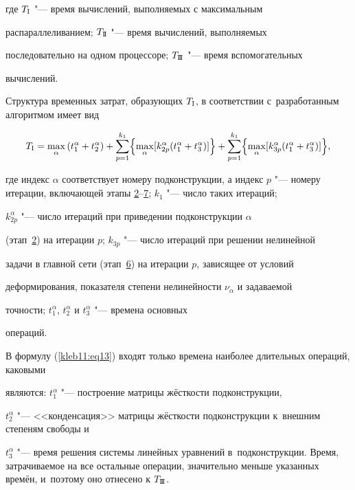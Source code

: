 где $T_\text{\sc I}$ "--- время вычислений, выполняемых с максимальным

распараллеливанием; $T_\text{\sc I\!I}$ "--- время вычислений, выполняемых

последовательно на одном процессоре; $T_\text{\sc I\!I\!I}$ "--- время вспомогательных

вычислений.



Структура временных затрат, образующих $T_\text{\sc I}$, в соответствии с~разработанным алгоритмом имеет вид

\begin{equation}

\label{kleb11:eq16} T_\text{\sc I}=\max _\alpha \left( t_1^\alpha + t_2^\alpha \right) + \sum \limits_{p=1}^{k_1}

\Bigl\{ \max_\alpha [k_{2p}^\alpha ( t_1^\alpha + t_3^\alpha ) ] \Bigr\} +

\sum\limits_{p=1}^{k_1} \Bigl\{ \max_\alpha [ k_{3p}^\alpha ( t_1^\alpha + t_3^\alpha  ) ] \Bigr\},

\end{equation}

где индекс $\alpha $ соответствует номеру подконструкции, а индекс $p$ "--- номеру итерации, включающей этапы \hyperlink{et:2}{2}--\hyperlink{et:7}{7}; $k_1$ "--- число таких итераций;

$k_{2p}^\alpha $ "--- число итераций при приведении подконструкции $\alpha $

(этап~\hyperlink{et:2}{2}) на итерации $p$; $k_{3p} $ "--- число итераций при решении нелинейной

задачи в главной сети (этап~\hyperlink{et:6}{6}) на итерации $p$, зависящее от условий

деформирования, показателя степени нелинейности $\nu_\alpha$ и задаваемой

точности; $t_1^\alpha $, $t_2^\alpha $ и $t_3^\alpha $ "--- времена основных

операций.



В формулу (\ref{kleb11:eq13}) входят только времена наиболее длительных операций, каковыми

являются: $t_1^\alpha $ "--- построение матрицы жёсткости подконструкции,

$t_2^\alpha$ "--- <<конденсация>> матрицы жёсткости подконструкции к~внешним степеням свободы  и 

$t_3^\alpha$ "--- время решения системы линейных уравнений в~подконструкции. Время, затрачиваемое на все остальные операции, значительно меньше указанных времён, и~поэтому оно отнесено к $T_\text{\sc I\!I\!I}$.



